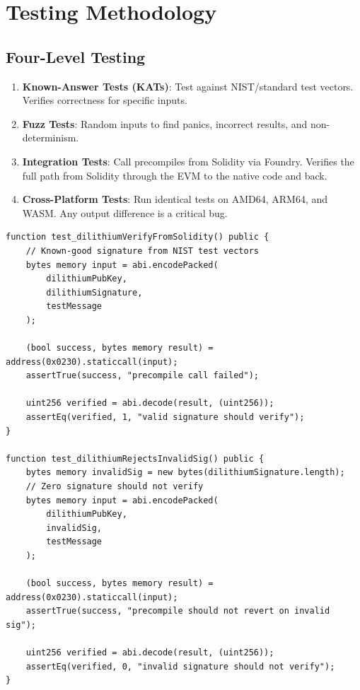 \section{Testing Methodology}


\subsection{Four-Level Testing}

\begin{enumerate}
  \item \textbf{Known-Answer Tests (KATs)}: Test against NIST/standard test vectors.
    Verifies correctness for specific inputs.
  \item \textbf{Fuzz Tests}: Random inputs to find panics, incorrect results, and
    non-determinism.
  \item \textbf{Integration Tests}: Call precompiles from Solidity via Foundry. Verifies
    the full path from Solidity through the EVM to the native code and back.
  \item \textbf{Cross-Platform Tests}: Run identical tests on AMD64, ARM64, and WASM.
    Any output difference is a critical bug.
\end{enumerate}

\begin{lstlisting}[language=Solidity,caption={Integration test for post-quantum verification}]
function test_dilithiumVerifyFromSolidity() public {
    // Known-good signature from NIST test vectors
    bytes memory input = abi.encodePacked(
        dilithiumPubKey,
        dilithiumSignature,
        testMessage
    );

    (bool success, bytes memory result) = address(0x0230).staticcall(input);
    assertTrue(success, "precompile call failed");

    uint256 verified = abi.decode(result, (uint256));
    assertEq(verified, 1, "valid signature should verify");
}

function test_dilithiumRejectsInvalidSig() public {
    bytes memory invalidSig = new bytes(dilithiumSignature.length);
    // Zero signature should not verify
    bytes memory input = abi.encodePacked(
        dilithiumPubKey,
        invalidSig,
        testMessage
    );

    (bool success, bytes memory result) = address(0x0230).staticcall(input);
    assertTrue(success, "precompile should not revert on invalid sig");

    uint256 verified = abi.decode(result, (uint256));
    assertEq(verified, 0, "invalid signature should not verify");
}
\end{lstlisting}

